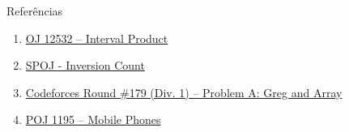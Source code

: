 \begin{frame}[fragile]{Referências}

    \begin{enumerate}
        \item \href{https://onlinejudge.org/index.php?option=com_onlinejudge&Itemid=8&category=24&page=show_problem&problem=3977}{OJ 12532 -- Interval Product}

        \item \href{https://www.spoj.com/problems/INVCNT/}{SPOJ - Inversion Count}

        \item \href{https://codeforces.com/problemset/problem/295/A}{Codeforces Round \#179 (Div. 1) -- Problem A: Greg and Array}

        \item \href{http://poj.org/problem?id=1195}{POJ 1195 -- Mobile Phones}

    \end{enumerate}

\end{frame}
